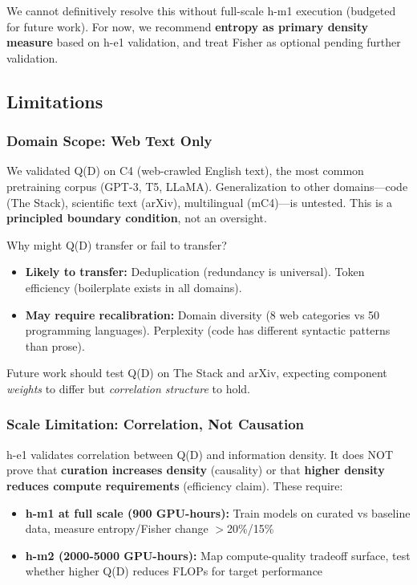 We cannot definitively resolve this without full-scale h-m1 execution (budgeted for future work). For now, we recommend \textbf{entropy as primary density measure} based on h-e1 validation, and treat Fisher as optional pending further validation.

\subsection{Limitations}

\subsubsection{Domain Scope: Web Text Only}

We validated Q(D) on C4 (web-crawled English text), the most common pretraining corpus (GPT-3, T5, LLaMA). Generalization to other domains---code (The Stack), scientific text (arXiv), multilingual (mC4)---is untested. This is a \textbf{principled boundary condition}, not an oversight.

Why might Q(D) transfer or fail to transfer?

\begin{itemize}
\item \textbf{Likely to transfer:} Deduplication (redundancy is universal). Token efficiency (boilerplate exists in all domains).
\item \textbf{May require recalibration:} Domain diversity (8 web categories vs 50 programming languages). Perplexity (code has different syntactic patterns than prose).
\end{itemize}

Future work should test Q(D) on The Stack and arXiv, expecting component \textit{weights} to differ but \textit{correlation structure} to hold.

\subsubsection{Scale Limitation: Correlation, Not Causation}

h-e1 validates correlation between Q(D) and information density. It does NOT prove that \textbf{curation increases density} (causality) or that \textbf{higher density reduces compute requirements} (efficiency claim). These require:

\begin{itemize}
\item \textbf{h-m1 at full scale (900 GPU-hours):} Train models on curated vs baseline data, measure entropy/Fisher change $>$20\%/15\%
\item \textbf{h-m2 (2000-5000 GPU-hours):} Map compute-quality tradeoff surface, test whether higher Q(D) reduces FLOPs for target performance
\end{itemize}

